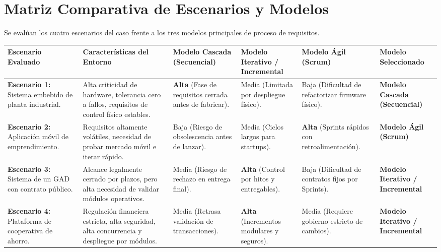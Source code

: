 \documentclass[conference]{IEEEtran}
\begin{document}
	\section{Matriz Comparativa de Escenarios y Modelos}
	Se evalúan los cuatro escenarios del caso frente a los tres modelos principales de proceso de requisitos.
	
	\begin{center}
		\centering
		\scriptsize
		\setlength{\tabcolsep}{3pt}
		\begin{tabularx}{\textwidth}{@{}p{2.6cm} Y p{1.8cm} p{1.8cm} p{1.8cm} p{2.2cm}@{}}
			\toprule
			\textbf{Escenario Evaluado} & \textbf{Características del Entorno} & \textbf{Modelo Cascada (Secuencial)} & \textbf{Modelo Iterativo / Incremental} & \textbf{Modelo Ágil (Scrum)} & \textbf{Modelo Seleccionado}\\
			\midrule
			\textbf{Escenario 1:} Sistema embebido de planta industrial. & Alta criticidad de hardware, tolerancia cero a fallos, requisitos de control físico estables. & \textbf{Alta} (Fase de requisitos cerrada antes de fabricar). & Media (Limitada por despliegue físico). & Baja (Dificultad de refactorizar firmware físico). & \textbf{Modelo Cascada (Secuencial)} \\
			\addlinespace[3pt]
			\textbf{Escenario 2:} Aplicación móvil de emprendimiento. & Requisitos altamente volátiles, necesidad de probar mercado móvil e iterar rápido. & Baja (Riesgo de obsolescencia antes de lanzar). & Media (Ciclos largos para startups). & \textbf{Alta} (Sprints rápidos con retroalimentación). & \textbf{Modelo Ágil (Scrum)} \\
			\addlinespace[3pt]
			\textbf{Escenario 3:} Sistema de un GAD con contrato público. & Alcance legalmente cerrado por plazos, pero alta necesidad de validar módulos operativos. & Media (Riesgo de rechazo en entrega final). & \textbf{Alta} (Control por hitos y entregables). & Baja (Dificultad de contratos fijos por Sprints). & \textbf{Modelo Iterativo / Incremental} \\
			\addlinespace[3pt]
			\textbf{Escenario 4:} Plataforma de cooperativa de ahorro. & Regulación financiera estricta, alta seguridad, alta concurrencia y despliegue por módulos. & Media (Retrasa validación de transacciones). & \textbf{Alta} (Incrementos modulares y seguros). & Media (Requiere gobierno estricto de cambios). & \textbf{Modelo Iterativo / Incremental} \\
			\bottomrule
		\end{tabularx}
	\end{center}
	
\end{document}
